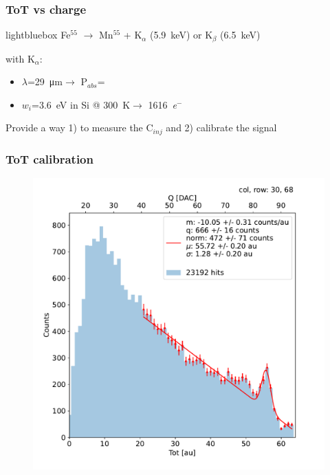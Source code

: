     \begin{frame}
        \frametitle{ToT vs charge }
        \begin{beamercolorbox}[sep=0em,wd=0.85\textwidth,ht=1.5ex, dp=0.1ex, rounded=true, center]{lightbluebox}
            Fe$^{55}$ $\rightarrow$ Mn$^{55}$ + K$_\alpha$ (\SI{5.9}{keV}) or K$_\beta$ (\SI{6.5}{keV})
        \end{beamercolorbox}



        with K$_\alpha$:
        \begin{itemize}
            \item $\lambda$=\SI{29}{\um}$\rightarrow$ P$_{abs}$=
            \item $w_i$=\SI{3.6}{eV} in Si @ \SI{300}{\kelvin}$\rightarrow$ \SI{1616}{\elementarycharge}$^-$
        \end{itemize}

        Provide a way 1) to measure the C$_{inj}$ and 2) calibrate the signal

    \end{frame}        

    \begin{frame}
        \frametitle{ToT calibration}
            \begin{figure}[h!]
                \centering
                \includegraphics[width=.99\linewidth]{figures/charaterization/fit_line_gauss_r69.pdf}
            \end{figure}

    \end{frame}     


